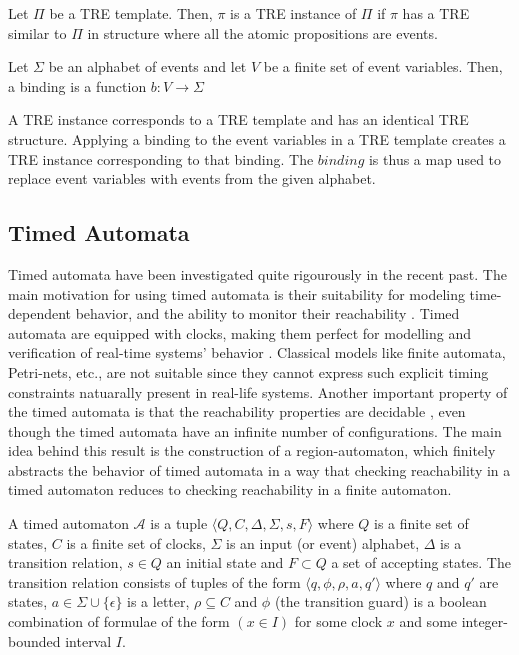 \documentclass[]{sigplanconf}
\begin{document}
\begin{defns}
Let $\Pi$ be a TRE template. Then, $\pi$ is a TRE instance of $\Pi$ if $\pi$ has a TRE similar to $\Pi$ in structure where all the atomic propositions are events.
\end{defns}

\begin{defns}[Binding]
Let $\Sigma$ be an alphabet of events and let $V$ be a finite set of event variables. Then, a binding is a function $b \colon V \rightarrow \Sigma$
\end{defns}

A TRE instance corresponds to a TRE template and has an identical TRE structure. Applying a binding to the event variables in a TRE template creates a TRE instance corresponding to that binding. The $binding$ is thus a map used to replace event variables with events from the given alphabet.

\subsection{Timed Automata}

Timed automata \cite{AD94} have been investigated quite rigourously in the recent past. The main motivation for using timed automata is their suitability for modeling time-dependent behavior, and the ability to monitor their reachability \cite{LPY97}. Timed automata are equipped with clocks, making them perfect for modelling and verification of real-time systems' behavior \cite{Alur1990, Alur1994183}. Classical models like finite automata, Petri-nets, etc., are not suitable since they cannot express such explicit timing constraints natuarally present in real-life systems. Another important property of the timed automata is that the reachability properties are decidable \cite{Alur1994183}, even though the timed automata have an infinite number of configurations. The main idea behind this result is the construction of a region-automaton, which finitely abstracts the behavior of timed automata in a way that checking reachability in a timed automaton reduces to checking reachability in a finite automaton.

\begin{defns}
A timed automaton  $\mathcal{A}$ is a tuple $\langle Q,C,\Delta ,\Sigma, s,F\rangle$ where $Q$ is a finite set of states, $C$ is a finite set of clocks, $\Sigma$ is an input (or event) alphabet, $\Delta$ is a transition relation, $s \in Q$ an initial state and $F \subset Q$ a set of accepting states. The transition relation consists of tuples of the form $\langle q ,\phi ,\rho, a, q' \rangle$ where $q$ and $q'$  are states, $a \in \Sigma \cup \{\epsilon \}$ is a letter, $\rho \subseteq C$ and $\phi$ (the transition guard) is a boolean combination of formulae of the form $(x \in I)$ for some clock $x$ and some integer-bounded interval $I$.
\end{defns}
\end{document}
